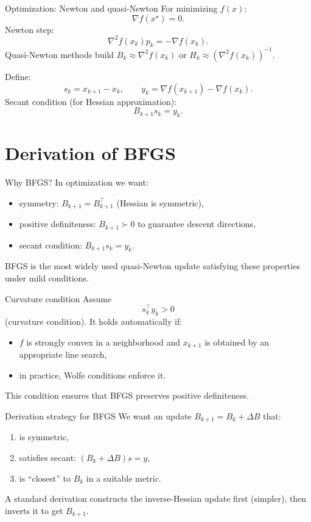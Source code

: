 \documentclass[aspectratio=169]{beamer}
\begin{document}
\begin{frame}{Optimization: Newton and quasi-Newton}
For minimizing $f(x)$:
\[
\nabla f(x^\star)=0.
\]
Newton step:
\[
\nabla^2 f(x_k) p_k = -\nabla f(x_k).
\]
Quasi-Newton methods build $B_k\approx \nabla^2 f(x_k)$ or $H_k\approx (\nabla^2 f(x_k))^{-1}$.

Define:
\[
s_k = x_{k+1}-x_k,\qquad y_k = \nabla f(x_{k+1})-\nabla f(x_k).
\]
Secant condition (for Hessian approximation):
\[
\boxed{B_{k+1}s_k = y_k.}
\]
\end{frame}

\section{Derivation of BFGS}

\begin{frame}{Why BFGS?}
In optimization we want:
\begin{itemize}
\item symmetry: $B_{k+1}=B_{k+1}^\top$ (Hessian is symmetric),
\item positive definiteness: $B_{k+1}\succ 0$ to guarantee descent directions,
\item secant condition: $B_{k+1}s_k=y_k$.
\end{itemize}

BFGS is the most widely used quasi-Newton update satisfying these properties under mild conditions.
\end{frame}

\begin{frame}{Curvature condition}
Assume
\[
\boxed{s_k^\top y_k>0}
\]
(curvature condition). It holds automatically if:
\begin{itemize}
\item $f$ is strongly convex in a neighborhood and $x_{k+1}$ is obtained by an appropriate line search,
\item in practice, Wolfe conditions enforce it.
\end{itemize}

This condition ensures that BFGS preserves positive definiteness.
\end{frame}

\begin{frame}{Derivation strategy for BFGS}
We want an update $B_{k+1}=B_k+\Delta B$ that:
\begin{enumerate}
\item is symmetric,
\item satisfies secant: $(B_k+\Delta B)s=y$,
\item is ``closest'' to $B_k$ in a suitable metric.
\end{enumerate}

A standard derivation constructs the inverse-Hessian update first (simpler),
then inverts it to get $B_{k+1}$.
\end{frame}
\end{document}
